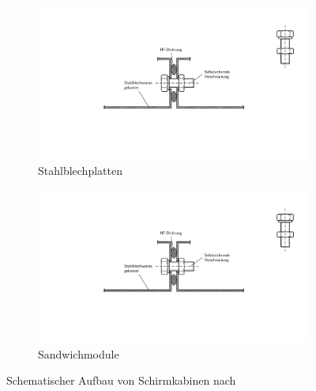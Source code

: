 \begin{figure}[H]
    \centering
    \begin{subfigure}[b]{0.4\textwidth}
        \includegraphics[page = 2, height=0.14\textheight,trim = 8.5cm 5.5cm 8.5cm 4.5cm, clip]{Abbildungen/Kapitel3/Schirmkabinen.pdf}
        \caption{Stahlblechplatten\label{subfig:3_Aufbau_Stahlblechkabine}}
    \end{subfigure}
    \hspace{1cm}
    \begin{subfigure}[b]{0.5\textwidth}
        \includegraphics[page = 3, height=0.135\textheight, trim = 11.5cm 6.5cm 7cm 6cm, clip]{Abbildungen/Kapitel3/Schirmkabinen.pdf}
        \caption{Sandwichmodule\label{subfig:3_Aufbau_Sandwichkabine}}
    \end{subfigure}
    \caption[Schematischer Aufbau von Schirmkabinen]{Schematischer Aufbau von Schirmkabinen nach~\cite{EMC-Technik_Stahlblechplatten, EMC-Technik_Sandwichmodul, EM_Schirmung, Design_of_shielded_enclosures}}
    \label{fig:3_Allgemeiner_Aufbau_Schirmkabinen}
\end{figure}

